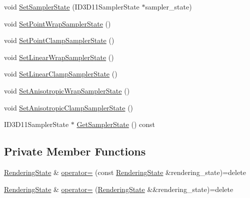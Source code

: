\begin{DoxyCompactItemize}
\item 
void \hyperlink{structmage_1_1_rendering_state_ab0c8450e46a9172871e5a40f2303bfb2}{Set\+Sampler\+State} (I\+D3\+D11\+Sampler\+State $\ast$sampler\+\_\+state)
\item 
void \hyperlink{structmage_1_1_rendering_state_ab8cebd05d1b01ec22f311aa0f1c1dc7e}{Set\+Point\+Wrap\+Sampler\+State} ()
\item 
void \hyperlink{structmage_1_1_rendering_state_aabf9e70b12cb12560e6c6c880bbc08ca}{Set\+Point\+Clamp\+Sampler\+State} ()
\item 
void \hyperlink{structmage_1_1_rendering_state_a6ffd109271b4988fa6d4a6fc2daa2125}{Set\+Linear\+Wrap\+Sampler\+State} ()
\item 
void \hyperlink{structmage_1_1_rendering_state_a4f414c7bed884194bd93d89f893c86b4}{Set\+Linear\+Clamp\+Sampler\+State} ()
\item 
void \hyperlink{structmage_1_1_rendering_state_a92318b9b250555ca1d6b516d49371abc}{Set\+Anisotropic\+Wrap\+Sampler\+State} ()
\item 
void \hyperlink{structmage_1_1_rendering_state_a52b80c58015fb64f0b8afa7712807ccd}{Set\+Anisotropic\+Clamp\+Sampler\+State} ()
\item 
I\+D3\+D11\+Sampler\+State $\ast$ \hyperlink{structmage_1_1_rendering_state_a251773f942157b07a7d3272e5e3c8a2e}{Get\+Sampler\+State} () const
\end{DoxyCompactItemize}
\subsection*{Private Member Functions}
\begin{DoxyCompactItemize}
\item 
\hyperlink{structmage_1_1_rendering_state}{Rendering\+State} \& \hyperlink{structmage_1_1_rendering_state_af03ad38dd9b88949fc9d3603e4829c26}{operator=} (const \hyperlink{structmage_1_1_rendering_state}{Rendering\+State} \&rendering\+\_\+state)=delete
\item 
\hyperlink{structmage_1_1_rendering_state}{Rendering\+State} \& \hyperlink{structmage_1_1_rendering_state_ad16e9963683b1eda6cbe675b8b210368}{operator=} (\hyperlink{structmage_1_1_rendering_state}{Rendering\+State} \&\&rendering\+\_\+state)=delete
\end{DoxyCompactItemize}
